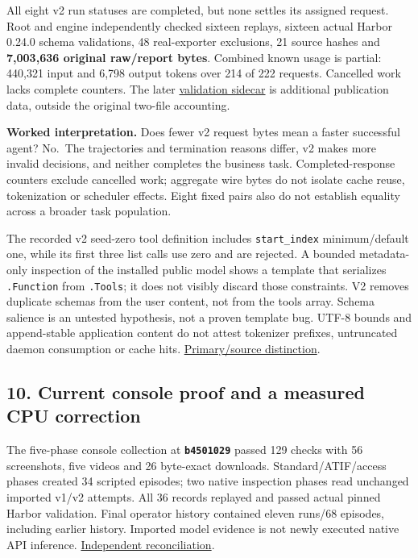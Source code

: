 \documentclass[
  11pt,
  letterpaper,
]{article}
\newcounter{none} %
\begin{document}
All eight v2 run statuses are completed, but none settles its assigned
request. Root and engine independently checked sixteen replays, sixteen
actual Harbor 0.24.0 schema validations, 48 real-exporter exclusions, 21
source hashes and \textbf{7,003,636 original raw/report bytes}. Combined
known usage is partial: 440,321 input and 6,798 output tokens over 214
of 222 requests. Cancelled work lacks complete counters. The later
\href{../../artifacts/access-ledger-study/20261010-v1/independent-validation.json}{validation
sidecar} is additional publication data, outside the original two-file
accounting.

\textbf{Worked interpretation.} Does fewer v2 request bytes mean a
faster successful agent? No.~The trajectories and termination reasons
differ, v2 makes more invalid decisions, and neither completes the
business task. Completed-response counters exclude cancelled work;
aggregate wire bytes do not isolate cache reuse, tokenization or
scheduler effects. Eight fixed pairs also do not establish equality
across a broader task population.

The recorded v2 seed-zero tool definition includes \texttt{start\_index}
minimum/default one, while its first three list calls use zero and are
rejected. A bounded metadata-only inspection of the installed public
model shows a template that serializes \texttt{.Function} from
\texttt{.Tools}; it does not visibly discard those constraints. V2
removes duplicate schemas from the user content, not from the tools
array. Schema salience is an untested hypothesis, not a proven template
bug. UTF-8 bounds and append-stable application content do not attest
tokenizer prefixes, untruncated daemon consumption or cache hits.
\href{../research/FOLLOWUP-SOURCES.md}{Primary/source distinction}.

\subsection{10. Current console proof and a measured CPU
correction}\label{current-console-proof-and-a-measured-cpu-correction}

The five-phase console collection at \textbf{\texttt{b4501029}} passed
129 checks with 56 screenshots, five videos and 26 byte-exact downloads.
Standard/ATIF/access phases created 34 scripted episodes; two native
inspection phases read unchanged imported v1/v2 attempts. All 36 records
replayed and passed actual pinned Harbor validation. Final operator
history contained eleven runs/68 episodes, including earlier history.
Imported model evidence is not newly executed native API inference.
\href{../../artifacts/qa/20261010-current-final-validation-v1/independent-validation.json}{Independent
reconciliation}.
\end{document}
